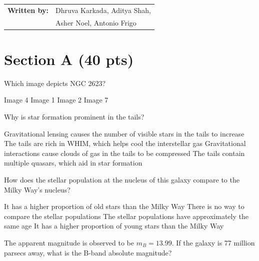 \documentclass{exam}
\begin{document}
\begin{center}
	\par
	\def\arraystretch{1}\tabcolsep=3pt
	\begin{tabular}{r l}
		 \textbf{{Written by:}} & Dhruva Karkada, Aditya Shah, \\
		  & Asher Noel, Antonio Frigo \\
	\end{tabular}
\end{center}
\newpage
\section*{Section A (40 pts)}
\setlength{\columnsep}{0.40 in}
\begin{multicols*}{2}
\renewcommand{\choiceshook}{\setlength{\leftmargin}{0.40 in}}
\renewcommand{\questionshook}{\setlength{\leftmargin}{0.0 in}}
\begin{questions}
\setcounter{question}{0}
\question Which image depicts NGC 2623?
	\begin{choices}
	\choice Image 4
	\choice Image 1
	\choice Image 2
	\CorrectChoice Image 7
	\end{choices}
\question Why is star formation prominent in the tails?
	\begin{choices}
	\choice Gravitational lensing causes the number of visible stars in the tails to increase
	\choice The tails are rich in WHIM, which helps cool the interstellar gas
	\CorrectChoice Gravitational interactions cause clouds of gas in the tails to be compressed
	\choice The tails contain multiple quasars, which aid in star formation
	\end{choices}
\question How does the stellar population at the nucleus of this galaxy compare to the Milky Way’s nucleus?
	\begin{choices}
	\choice It has a higher proportion of old stars than the Milky Way
	\choice There is no way to compare the stellar populations
	\choice The stellar populations have approximately the same age
	\CorrectChoice It has a higher proportion of young stars than the Milky Way
	\end{choices}
\question The apparent magnitude is observed to be $m_B=13.99$. If the galaxy is 77 million parsecs away, what is the B-band absolute magnitude?
	\begin{choices}
	\CorrectChoice -20.4 
	\choice -13.3
	\choice 2.4
	\choice 13.3
	\end{choices}
\end{questions}
\hrulefill
\begin{questions}

\end{questions}
\end{multicols*}
\end{document}
